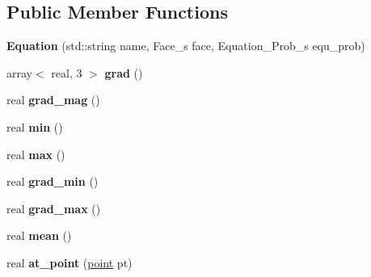 \subsection*{Public Member Functions}
\begin{DoxyCompactItemize}
\item 
\hypertarget{classEquation_aa828f4c9f7a849e9ae29f2c9491863d6}{{\bfseries Equation} (std\+::string name, Face\+\_\+s face, Equation\+\_\+\+Prob\+\_\+s equ\+\_\+prob)}\label{classEquation_aa828f4c9f7a849e9ae29f2c9491863d6}

\item 
\hypertarget{classEquation_acda03fc82a1a28ab32f127754bf37aea}{array$<$ real, 3 $>$ {\bfseries grad} ()}\label{classEquation_acda03fc82a1a28ab32f127754bf37aea}

\item 
\hypertarget{classEquation_ab67fb5e35d95e74756aed668b072c03f}{real {\bfseries grad\+\_\+mag} ()}\label{classEquation_ab67fb5e35d95e74756aed668b072c03f}

\item 
\hypertarget{classEquation_a629f1ff3c54e7fcfe597c20ab49c773b}{real {\bfseries min} ()}\label{classEquation_a629f1ff3c54e7fcfe597c20ab49c773b}

\item 
\hypertarget{classEquation_a1e95e7d54591e5dc5c68ccca547101c5}{real {\bfseries max} ()}\label{classEquation_a1e95e7d54591e5dc5c68ccca547101c5}

\item 
\hypertarget{classEquation_a3a22bc1a6dd067b6feaf6fc6281a5c1f}{real {\bfseries grad\+\_\+min} ()}\label{classEquation_a3a22bc1a6dd067b6feaf6fc6281a5c1f}

\item 
\hypertarget{classEquation_ae2b284533eda56200c9122846623eb45}{real {\bfseries grad\+\_\+max} ()}\label{classEquation_ae2b284533eda56200c9122846623eb45}

\item 
\hypertarget{classEquation_ae0198edcc6a9a44ed7d88d8279f91cee}{real {\bfseries mean} ()}\label{classEquation_ae0198edcc6a9a44ed7d88d8279f91cee}

\item 
\hypertarget{classEquation_a900d7e3147857220ca4981a8bf9c0c01}{real {\bfseries at\+\_\+point} (\hyperlink{structpoint}{point} pt)}\label{classEquation_a900d7e3147857220ca4981a8bf9c0c01}

\end{DoxyCompactItemize}

